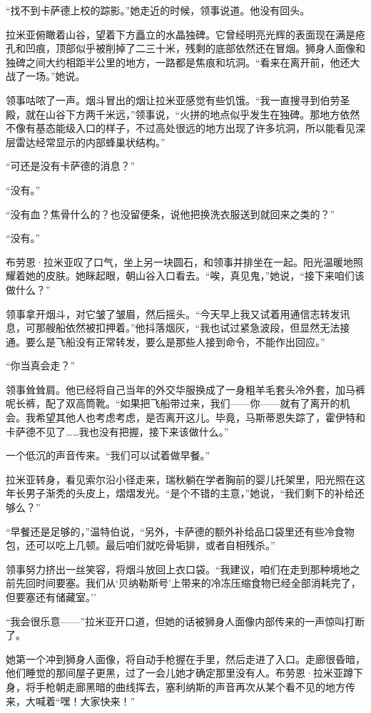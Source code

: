 \documentclass[AutoFakeBold=true]{book}
\begin{document}
``找不到卡萨德上校的踪影。''她走近的时候，领事说道。他没有回头。

拉米亚俯瞰着山谷，望着下方矗立的水晶独碑。它曾经明亮光辉的表面现在满是疮孔和凹痕，顶部似乎被削掉了二三十米，残剩的底部依然还在冒烟。狮身人面像和独碑之间大约相距半公里的地方，一路都是焦痕和坑洞。``看来在离开前，他还大战了一场。''她说。

领事咕哝了一声。烟斗冒出的烟让拉米亚感觉有些饥饿。``我一直搜寻到伯劳圣殿，就在山谷下方两千米远，''领事说，``火拼的地点似乎发生在独碑。那地方依然不像有基态能级入口的样子，不过高处很远的地方出现了许多坑洞，所以能看见深层雷达经常显示的内部蜂巢状结构。''

``可还是没有卡萨德的消息？''

``没有。''

``没有血？焦骨什么的？也没留便条，说他把换洗衣服送到就回来之类的？''

``没有。''

布劳恩·拉米亚叹了口气，坐上另一块圆石，和领事并排坐在一起。阳光温暖地照耀着她的皮肤。她眯起眼，朝山谷入口看去。``唉，真见鬼，''她说，``接下来咱们该做什么？''

领事拿开烟斗，对它皱了皱眉，然后摇头。``今天早上我又试着用通信志转发讯息，可那艘船依然被扣押着。''他抖落烟灰，``我也试过紧急波段，但显然无法接通。要么是飞船没有正常转发，要么是那些人接到命令，不能作出回应。''

``你当真会走？''

领事耸耸肩。他已经将自己当年的外交华服换成了一身粗羊毛套头冷外套，加马裤呢长裤，配了双高筒靴。``如果把飞船带过来，我们——你——就有了离开的机会。我希望其他人也考虑考虑，是否离开这儿。毕竟，马斯蒂恩失踪了，霍伊特和卡萨德不见了……我也没有把握，接下来该做什么。''

一个低沉的声音传来。``我们可以试着做早餐。''

拉米亚转身，看见索尔沿小径走来，瑞秋躺在学者胸前的婴儿托架里，阳光照在这年长男子渐秃的头皮上，熠熠发光。``是个不错的主意，''她说，``我们剩下的补给还够么？''

``早餐还是足够的，''温特伯说，``另外，卡萨德的额外补给品口袋里还有些冷食物包，还可以吃上几顿。最后咱们就吃骨垢猅，或者自相残杀。''

领事努力挤出一丝笑容，将烟斗放回上衣口袋。``我建议，咱们在走到那种境地之前先回时间要塞。我们从`贝纳勒斯号'上带来的冷冻压缩食物已经全部消耗完了，但要塞还有储藏室。''

``我会很乐意——''拉米亚开口道，但她的话被狮身人面像内部传来的一声惊叫打断了。

她第一个冲到狮身人面像，将自动手枪握在手里，然后走进了入口。走廊很昏暗，他们睡觉的那间屋子更黑，过了一会儿她才确定那里没有人。布劳恩·拉米亚蹲下身，将手枪朝走廊黑暗的曲线挥去，塞利纳斯的声音再次从某个看不见的地方传来，大喊着``嘿！大家快来！''
\end{document}
